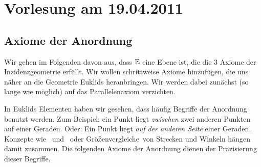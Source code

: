%








\section*{Vorlesung am 19.04.2011}



\subsection*{Axiome der Anordnung}





Wir gehen im Folgenden davon aus, dass $\mathbb E$ eine Ebene ist, die die 3
Axiome der Inzidenzgeometrie erfüllt. Wir wollen schrittweise Axiome
hinzufügen, die uns näher an die Geometrie Euklids heranbringen.
Wir werden dabei zunächst (so lange wie möglich) auf das Parallelenaxiom verzichten.




In Euklids Elementen haben wir
gesehen, dass häufig Begriffe der Anordnung benutzt werden. 
Zum Beispiel: \glqq ein Punkt %
liegt {\em zwischen} zwei anderen Punkten %
auf einer Geraden\grqq . 
Oder: \glqq Ein Punkt %
liegt {\em auf der anderen Seite} einer Geraden\grqq .
Konzepte wie \grqq\  und \grqq\
oder \glqq Größenvergleiche\grqq\ von Strecken und Winkeln 
hängen damit zusammen.
Die folgenden Axiome der Anordnung dienen der Präzisierung dieser Begriffe.


